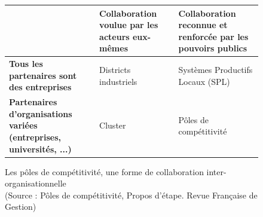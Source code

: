 \documentclass[a4paper,12pt]{report}
\begin{document}
		\begin{figure}[!h]		
		
		\vspace{11pt}
		\begin{center}
		\begin{tabular}{|M{110pt}|M{100pt}|M{100pt}|}
			\hline
			& \textbf{Collaboration voulue par les acteurs eux-mêmes} & \textbf{Collaboration reconnue et renforcée par les pouvoirs publics}\\
			\hline
			\textbf{Tous les partenaires sont des entreprises} & Districts industriels & Systèmes Productifs Locaux (SPL)\\
			\hline
			\textbf{Partenaires d'organisations variées (entreprises, universités, ...)} & Cluster & Pôles de compétitivité\\
			\hline
		\end{tabular}
		
		\caption{Les pôles de compétitivité, une forme de collaboration inter-organisationnelle \\(Source : Pôles de compétitivité, Propos d'étape. Revue Française de Gestion\cite{PoleCompetitivite})}
		
		\label{ComparaisonSystemesCollaboratifs}
		\end{center}
		\end{figure}
		
\end{document}
